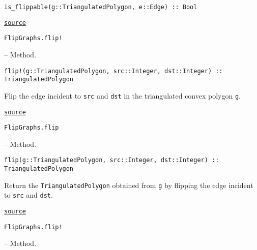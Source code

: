 \begin{adjustwidth}{2em}{0pt}


\begin{verbatim}
is_flippable(g::TriangulatedPolygon, e::Edge) :: Bool
\end{verbatim}



\href{https://github.com/schto223/FlipGraphs.jl/blob/490c01a7adf74b42f27dda05099165c47ae8133e/src/polygonTriangulations.jl#L204-L206}{\texttt{source}}


\end{adjustwidth}
\hypertarget{17369255639942436693}{\texttt{FlipGraphs.flip!}}  -- {Method.}

\begin{adjustwidth}{2em}{0pt}


\begin{verbatim}
flip!(g::TriangulatedPolygon, src::Integer, dst::Integer) :: TriangulatedPolygon
\end{verbatim}

Flip the edge incident to \texttt{src} and \texttt{dst} in the triangulated convex polygon \texttt{g}.



\href{https://github.com/schto223/FlipGraphs.jl/blob/490c01a7adf74b42f27dda05099165c47ae8133e/src/polygonTriangulations.jl#L162-L166}{\texttt{source}}


\end{adjustwidth}
\hypertarget{863666498151329777}{\texttt{FlipGraphs.flip}}  -- {Method.}

\begin{adjustwidth}{2em}{0pt}


\begin{verbatim}
flip(g::TriangulatedPolygon, src::Integer, dst::Integer) :: TriangulatedPolygon
\end{verbatim}

Return the \texttt{TriangulatedPolygon} obtained from \texttt{g} by flipping the edge incident to \texttt{src} and \texttt{dst}.



\href{https://github.com/schto223/FlipGraphs.jl/blob/490c01a7adf74b42f27dda05099165c47ae8133e/src/polygonTriangulations.jl#L141-L145}{\texttt{source}}


\end{adjustwidth}
\hypertarget{3573918791108921628}{\texttt{FlipGraphs.flip!}}  -- {Method.}

